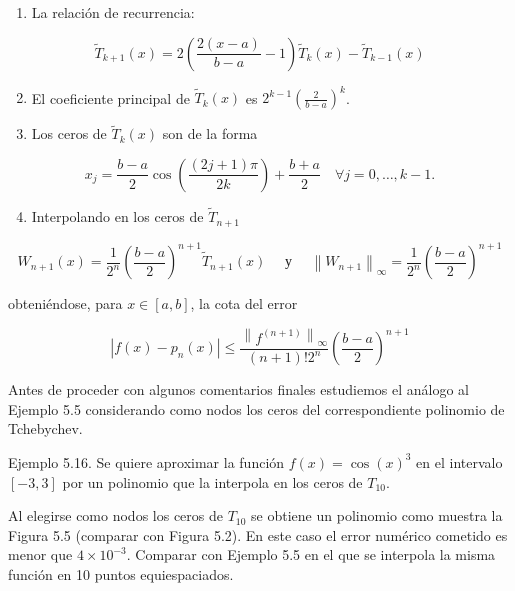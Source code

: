\documentclass[10pt]{book}
\begin{document}
\begin{enumerate}
  \item La relación de recurrencia:
\end{enumerate}

$$
\widetilde{T}_{k+1}(x)=2\left(\frac{2(x-a)}{b-a}-1\right) \widetilde{T}_{k}(x)-\widetilde{T}_{k-1}(x)
$$

\begin{enumerate}
  \setcounter{enumi}{1}
  \item El coeficiente principal de $\widetilde{T}_{k}(x)$ es $2^{k-1}\left(\frac{2}{b-a}\right)^{k}$.
  \item Los ceros de $\widetilde{T}_{k}(x)$ son de la forma
\end{enumerate}

$$
x_{j}=\frac{b-a}{2} \cos \left(\frac{(2 j+1) \pi}{2 k}\right)+\frac{b+a}{2} \quad \forall j=0, \ldots, k-1 .
$$

\begin{enumerate}
  \setcounter{enumi}{3}
  \item Interpolando en los ceros de $\widetilde{T}_{n+1}$
\end{enumerate}

$$
W_{n+1}(x)=\frac{1}{2^{n}}\left(\frac{b-a}{2}\right)^{n+1} \widetilde{T}_{n+1}(x) \quad \text { у } \quad\left\|W_{n+1}\right\|_{\infty}=\frac{1}{2^{n}}\left(\frac{b-a}{2}\right)^{n+1}
$$

obteniéndose, para $x \in[a, b]$, la cota del error

$$
\left|f(x)-p_{n}(x)\right| \leq \frac{\left\|f^{(n+1)}\right\|_{\infty}}{(n+1)!2^{n}}\left(\frac{b-a}{2}\right)^{n+1}
$$

Antes de proceder con algunos comentarios finales estudiemos el análogo al Ejemplo 5.5 considerando como nodos los ceros del correspondiente polinomio de Tchebychev.

Ejemplo 5.16. Se quiere aproximar la función $f(x)=\cos (x)^{3}$ en el intervalo $[-3,3]$ por un polinomio que la interpola en los ceros de $T_{10}$.

Al elegirse como nodos los ceros de $T_{10}$ se obtiene un polinomio como muestra la Figura 5.5 (comparar con Figura 5.2). En este caso el error numérico cometido es menor que $4 \times 10^{-3}$. Comparar con Ejemplo 5.5 en el que se interpola la misma función en 10 puntos equiespaciados.
\end{document}
